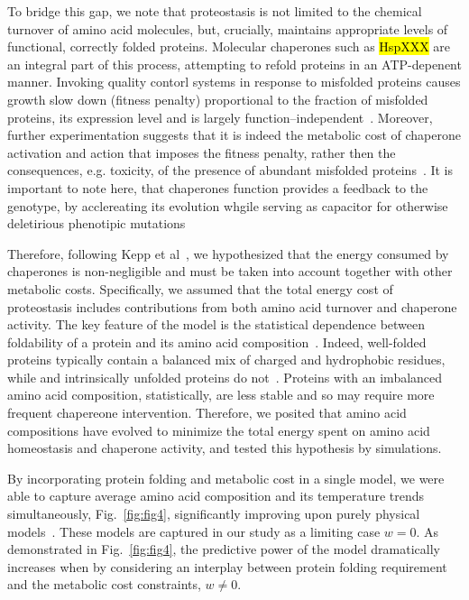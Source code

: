 \documentclass[10pt,letterpaper]{article}
\begin{document}
To bridge this gap, we note that proteostasis is not limited to the chemical turnover of amino acid molecules, but, crucially, maintains appropriate levels of functional, correctly folded proteins. Molecular chaperones such as \hl{HspXXX} are an integral part of this process, attempting to refold proteins in an ATP-depenent manner. Invoking quality contorl systems in response to misfolded proteins causes growth slow down (fitness penalty) proportional to the fraction of misfolded proteins, its expression level and is largely function--independent~\cite{Samerotte2011Misfolded}. Moreover, further experimentation suggests that it is indeed the metabolic cost of chaperone activation and action that imposes the fitness penalty, rather then the consequences, e.g. toxicity, of the presence of abundant misfolded proteins~\cite{Tomala2014Fitness}. It is important to note here, that chaperones function provides a feedback to the genotype, by acclereating its evolution whgile serving as capacitor for otherwise deletirious phenotipic mutations~\cite{Bogumil2012Cumulative,Cetinbas2013Catalysis}


Therefore, following Kepp et al~\cite{Kepp2014Model}, we hypothesized that the energy consumed by chaperones is non-negligible and must be taken into account together with other metabolic costs. Specifically, we assumed that the total energy cost of proteostasis includes contributions from both amino acid turnover and chaperone activity. The key feature of the model is the statistical dependence between foldability of a protein and its amino acid composition~\cite{Dill1985Theory,Berezovsky2007Positive,Venev2015Massively}. Indeed, well-folded proteins typically  contain a balanced mix of charged and hydrophobic residues, while and intrinsically unfolded proteins do not~\cite{Uversky2000Why}. Proteins with an imbalanced amino acid composition, statistically, are less stable and so may require more frequent chapereone intervention. Therefore, we posited that amino acid compositions have evolved to minimize the total energy spent on amino acid homeostasis and chaperone activity, and tested this hypothesis by simulations.

By incorporating protein folding and metabolic cost in a single model, we were able to capture average amino acid composition and its temperature trends simultaneously, Fig.~\ref{fig:fig4}, significantly improving upon purely physical models~\cite{Berezovsky2007Positive,Venev2015Massively}. These  models are captured in our study as a limiting case $\mathit{w}=0$. As demonstrated in Fig.~\ref{fig:fig4}, the predictive power of the model dramatically increases when by considering an interplay between protein folding requirement and the metabolic cost constraints, $w\neq 0$.
\end{document}
